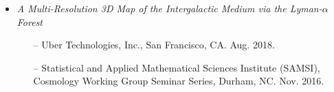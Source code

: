 \documentclass[letterpaper,10pt]{article}
\begin{document}
\begin{itemize}[itemsep=0.3cm]
\item {\it A Multi-Resolution 3D Map of the Intergalactic Medium via the Lyman-$\alpha$ Forest}
\begin{itemize}[leftmargin=0.55cm, itemsep=0.1cm]
\item[--] Uber Technologies, Inc., San Francisco, CA. Aug. 2018.
\item[--] Statistical and Applied Mathematical Sciences Institute (SAMSI), Cosmology Working Group Seminar Series, Durham, NC. Nov. 2016.
\end{itemize}

\end{itemize}


\vspace{0.1cm}
\end{document}
